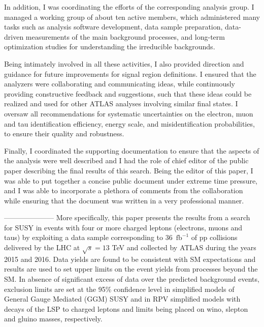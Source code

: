 In addition, I was coordinating the efforts of the corresponding analysis group. I managed a working group of about ten active members, which administered many tasks such as analysis software development, data sample preparation, data-driven measurements of the main background processes, and long-term optimization studies for understanding the irreducible backgrounds. 

Being intimately involved in all these activities, I also provided direction and guidance for future improvements for signal region definitions. I ensured that the analyzers were collaborating and communicating ideas, while
continuously providing constructive feedback and suggestions, such that these ideas could be realized and used for other ATLAS analyses involving similar final states. I oversaw all recommendations for systematic uncertainties on the electron, muon and tau identification efficiency, energy scale, and misidentification probabilities, to ensure their quality and robustness.

Finally, I coordinated the supporting documentation to ensure that the aspects of the analysis were well described and I had the role of chief editor of the public paper describing the final results of this search. Being the editor of this paper, I was able to put together a concise public document under extreme time pressure, and I was able to incorporate a plethora of comments from the collaboration while ensuring that the document was written in a very
professional manner.

---------------------
More specifically, this paper presents the results from a search for SUSY in events with four or more charged leptons (electrons, muons and taus) by exploiting a data sample corresponding to 36~$\mathrm{fb}^{-1}$ of pp collisions 
delivered by the LHC at  $\sqrt{s}=13$ TeV and collected by ATLAS during the years 2015 and 2016.
Data yields are found to be consistent with SM expectations and results are used to set upper limits on the event yields from processes beyond the SM. In absence of significant excess of data over the predicted background events, exclusion limits are set at the 95\% confidence level in simplified models of General Gauge Mediated (GGM) SUSY and in RPV simplified models with decays of the LSP to charged leptons and limits being placed on wino, slepton and gluino masses, respectively.


